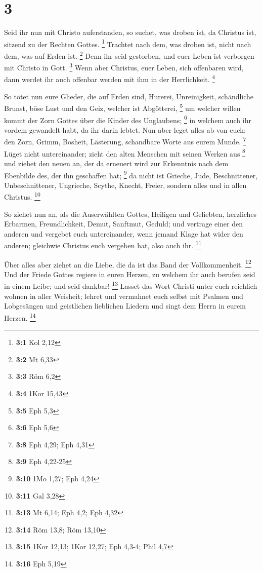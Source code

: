 \hypertarget{section-1}{%
\section{3}\label{section-1}}

 Seid ihr nun mit Christo auferstanden, so suchet, was
droben ist, da Christus ist, sitzend zu der Rechten Gottes. \footnote{\textbf{3:1}
  Kol 2,12}  Trachtet nach dem, was droben ist, nicht nach
dem, was auf Erden ist. \footnote{\textbf{3:2} Mt 6,33} 
Denn ihr seid gestorben, und euer Leben ist verborgen mit Christo in
Gott. \footnote{\textbf{3:3} Röm 6,2}  Wenn aber Christus,
euer Leben, sich offenbaren wird, dann werdet ihr auch offenbar werden
mit ihm in der Herrlichkeit. \footnote{\textbf{3:4} 1Kor 15,43}

 So tötet nun eure Glieder, die auf Erden sind, Hurerei,
Unreinigkeit, schändliche Brunst, böse Lust und den Geiz, welcher ist
Abgötterei, \footnote{\textbf{3:5} Eph 5,3}  um welcher
willen kommt der Zorn Gottes über die Kinder des Unglaubens; \footnote{\textbf{3:6}
  Eph 5,6}  in welchem auch ihr vordem gewandelt habt, da
ihr darin lebtet.  Nun aber leget alles ab von euch: den
Zorn, Grimm, Bosheit, Lästerung, schandbare Worte aus eurem Munde.
\footnote{\textbf{3:8} Eph 4,29; Eph 4,31}  Lüget nicht
untereinander; zieht den alten Menschen mit seinen Werken aus
\footnote{\textbf{3:9} Eph 4,22-25}  und ziehet den neuen
an, der da erneuert wird zur Erkenntnis nach dem Ebenbilde des, der ihn
geschaffen hat; \footnote{\textbf{3:10} 1Mo 1,27; Eph 4,24}
 da nicht ist Grieche, Jude, Beschnittener,
Unbeschnittener, Ungrieche, Scythe, Knecht, Freier, sondern alles und in
allen Christus. \footnote{\textbf{3:11} Gal 3,28}

 So ziehet nun an, als die Auserwählten Gottes, Heiligen
und Geliebten, herzliches Erbarmen, Freundlichkeit, Demut, Sanftmut,
Geduld;  und vertrage einer den anderen und vergebet euch
untereinander, wenn jemand Klage hat wider den anderen; gleichwie
Christus euch vergeben hat, also auch ihr. \footnote{\textbf{3:13} Mt
  6,14; Eph 4,2; Eph 4,32}

 Über alles aber ziehet an die Liebe, die da ist das Band
der Vollkommenheit. \footnote{\textbf{3:14} Röm 13,8; Röm 13,10}
 Und der Friede Gottes regiere in euren Herzen, zu welchem
ihr auch berufen seid in einem Leibe; und seid dankbar! \footnote{\textbf{3:15}
  1Kor 12,13; 1Kor 12,27; Eph 4,3-4; Phil 4,7}  Lasset das
Wort Christi unter euch reichlich wohnen in aller Weisheit; lehret und
vermahnet euch selbst mit Psalmen und Lobgesängen und geistlichen
lieblichen Liedern und singt dem Herrn in eurem Herzen. \footnote{\textbf{3:16}
  Eph 5,19}

